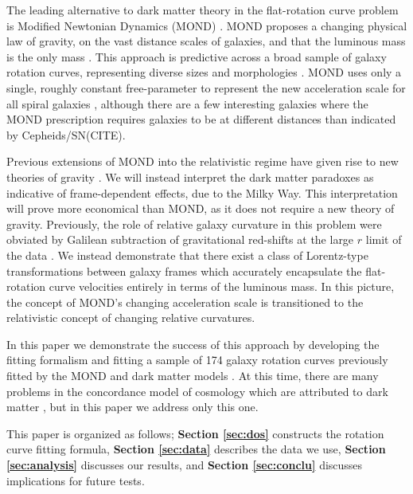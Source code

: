 \documentclass[reprint,%
 amsmath,amssymb,
 aps,
]{revtex4-1}
\begin{document}
  
 
     The leading   alternative    to dark matter theory  in the flat-rotation curve problem is   Modified Newtonian Dynamics (MOND) \cite{Milgrom}.  
     MOND    proposes    
     a changing  physical law of gravity,    on the vast distance scales of galaxies, and  that the   luminous mass is the only mass   \cite{McGaugh_2014}. 
  This approach  is   predictive across a  broad  sample of galaxy rotation curves,  representing diverse    sizes and morphologies \cite{2016Lelli}.  
  MOND uses only   a single, roughly constant free-parameter to represent the new acceleration scale for all spiral   galaxies  \cite{McGaugh2016RAR,2022A&A...664A..40M}, although there are a few interesting galaxies where the MOND prescription requires galaxies to be at different distances than indicated by Cepheids/SN(CITE). 
  
  
  Previous extensions of MOND into the relativistic regime have given rise to  new theories of gravity  \cite{PhysRevD.70.083509,doi:10.1142/S0217751X0703666X,Famaey2012}.  We will instead  interpret the dark matter paradoxes   as  indicative of  frame-dependent effects,   due to the Milky Way. This interpretation will prove more economical than MOND, as it does not require a new theory of gravity.
   Previously, the role of relative
     galaxy curvature  in this problem  were    obviated 
       by  Galilean subtraction of   gravitational red-shifts at the  large $r$  limit of the data \citep{MTW}. We instead demonstrate that there exist a class of Lorentz-type transformations between galaxy frames which accurately encapsulate the flat-rotation curve velocities entirely in terms of the luminous mass. In this picture, the concept of  MOND's changing acceleration scale is  transitioned to  the relativistic concept  of  changing   relative curvatures. 
       
       
  In this paper we   demonstrate the success of this approach by developing the fitting formalism and fitting   a sample of 174 galaxy rotation curves previously fitted by the MOND and dark matter models  \cite{McGaugh2016RAR,2016Lelli,McGaugh_2014,Li_2018}.  
       At this time, there are many problems in   the concordance model of   cosmology which are attributed to dark matter \cite{2010dmp..book.....S,Tully:2014gfa,Naidu_2022}, but in
 this paper we address only this  one.  
  
 
 
 
This paper  is organized as follows;
{\bf Section \ref{sec:dos}} constructs  the rotation curve  fitting formula, 
{\bf Section \ref{sec:data}}   describes  the data we use, 
 {\bf Section \ref{sec:analysis}}   discusses our results, 
 and  {\bf Section \ref{sec:conclu}}   discusses implications for future tests.   
  
\end{document}
